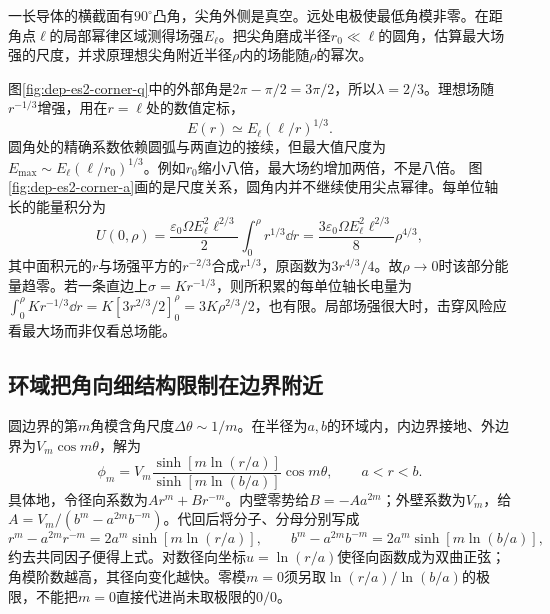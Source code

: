 \begin{example}[直角金属边缘的场增强]
一长导体的横截面有$90^\circ$凸角，尖角外侧是真空。远处电极使最低角模非零。在距角点$\ell$的局部幂律区域测得场强$E_\ell$。把尖角磨成半径$r_0\ll\ell$的圆角，估算最大场强的尺度，并求原理想尖角附近半径$\rho$内的场能随$\rho$的幂次。
\end{example}
\begin{solution}
图\ref{fig:dep-es2-corner-q}中的外部角是$2\pi-\pi/2=3\pi/2$，所以$\lambda=2/3$。理想场随$r^{-1/3}$增强，用在$r=\ell$处的数值定标，
\[
 E(r)\simeq E_\ell(\ell/r)^{1/3}.
\]
圆角处的精确系数依赖圆弧与两直边的接续，但最大值尺度为$E_{\max}\sim E_\ell(\ell/r_0)^{1/3}$。例如$r_0$缩小八倍，最大场约增加两倍，不是八倍。
图\ref{fig:dep-es2-corner-a}画的是尺度关系，圆角内并不继续使用尖点幂律。每单位轴长的能量积分为
\[U(0,\rho)=\frac{\varepsilon_0\Omega E_\ell^2\ell^{2/3}}2
\int_0^\rho r^{1/3}\dd r
=\frac{3\varepsilon_0\Omega E_\ell^2\ell^{2/3}}8\rho^{4/3},\]
其中面积元的$r$与场强平方的$r^{-2/3}$合成$r^{1/3}$，原函数为$3r^{4/3}/4$。故$\rho\to0$时该部分能量趋零。若一条直边上$\sigma=Kr^{-1/3}$，则所积累的每单位轴长电量为$\int_0^\rho Kr^{-1/3}\dd r=K[3r^{2/3}/2]_0^\rho=3K\rho^{2/3}/2$，也有限。局部场强很大时，击穿风险应看最大场而非仅看总场能。
\end{solution}

\subsection{环域把角向细结构限制在边界附近}
圆边界的第$m$角模含角尺度$\Delta\theta\sim1/m$。在半径为$a,b$的环域内，内边界接地、外边界为$V_m\cos m\theta$，解为
\[
 \phi_m=V_m\frac{\sinh[m\ln(r/a)]}{\sinh[m\ln(b/a)]}\cos m\theta,
 \qquad a<r<b.
\]
具体地，令径向系数为$Ar^m+Br^{-m}$。内壁零势给$B=-Aa^{2m}$；外壁系数为$V_m$，给$A=V_m/(b^m-a^{2m}b^{-m})$。代回后将分子、分母分别写成
\[r^m-a^{2m}r^{-m}=2a^m\sinh[m\ln(r/a)],\qquad
b^m-a^{2m}b^{-m}=2a^m\sinh[m\ln(b/a)],\]
约去共同因子便得上式。对数径向坐标$u=\ln(r/a)$使径向函数成为双曲正弦；角模阶数越高，其径向变化越快。零模$m=0$须另取$\ln(r/a)/\ln(b/a)$的极限，不能把$m=0$直接代进尚未取极限的$0/0$。

